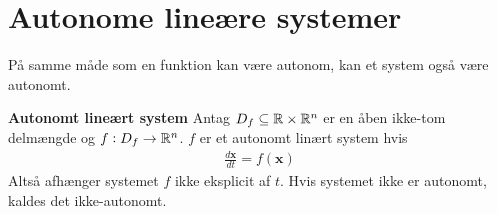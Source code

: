 \section{Autonome lineære systemer}
På samme måde som en funktion kan være autonom, kan et system også være autonomt.

\begin{minipage}\textwidth
\begin{defn}\textbf{Autonomt lineært system} %
\newline
Antag $D_f \subseteq \mathbb{R} \times \mathbb{R}^n$ er en åben ikke-tom delmængde og $f: D_f \rightarrow \mathbb{R}^n$.  $f$ er et autonomt linært system hvis
\begin{align*}
    \frac{d\textbf{x}}{dt} = f(\textbf{x})
\end{align*}
Altså afhænger systemet $f$ ikke eksplicit af $t$. Hvis systemet ikke er autonomt, kaldes det ikke-autonomt. 
\end{defn}
\end{minipage}




